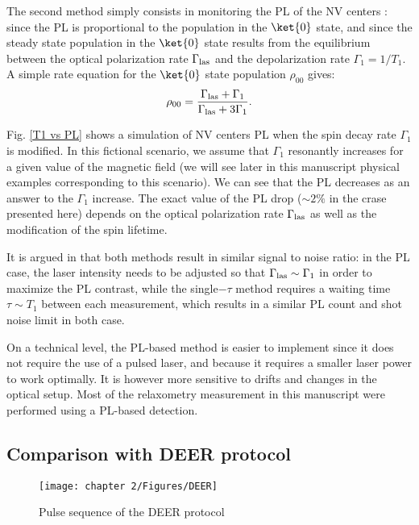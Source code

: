 \documentclass[a4paper, 11pt]{report}
\begin{document}
 The second method simply consists in monitoring the PL of the NV centers : since the PL is proportional to the population in the $\ket{0}$ state, and since the steady state population in the $\ket{0}$ state results from the equilibrium between the optical polarization rate $\Gamma_{\rm las}$ and the depolarization rate $\Gamma_1=1/T_1$. A simple rate equation for the $\ket{0}$ state population $\rho_{00}$ gives:
 \begin{equation}
 \rho_{00}=\frac{\Gamma_{\rm las}+\Gamma_1}{\Gamma_{\rm las}+3\Gamma_1}.
 \end{equation}
 
 Fig. \ref{T1 vs PL} shows a simulation of NV centers PL when the spin decay rate $\Gamma_1$ is modified. In this fictional scenario, we assume that $\Gamma_1$ resonantly increases for a given value of the magnetic field (we will see later in this manuscript physical examples corresponding to this scenario). We can see that the PL decreases as an answer to the $\Gamma_1$ increase. The exact value of the PL drop ($\sim 2\%$ in the crase presented here) depends on the optical polarization rate $\Gamma_{\rm las}$ as well as the modification of the spin lifetime. 

It is argued in \citep{finco2021imaging} that both methods result in similar signal to noise ratio: in the PL case, the laser intensity needs to be adjusted so that $\Gamma_{\rm las} \sim \Gamma_1$ in order to maximize the PL contrast, while the single$-\tau$ method requires a waiting time $\tau \sim T_1$ between each measurement, which results in a similar PL count and shot noise limit in both case.

On a technical level, the PL-based method is easier to implement since it does not require the use of a pulsed laser, and because it requires a smaller laser power to work optimally. It is however more sensitive to drifts and changes in the optical setup. Most of the relaxometry measurement in this manuscript were performed using a PL-based detection.

\subsection{Comparison with DEER protocol}

\begin{figure}[h]
\centering
\texttt{[image: chapter 2/Figures/DEER]}
\caption{Pulse sequence of the DEER protocol}
\label{DEER}
\end{figure}
\end{document}
